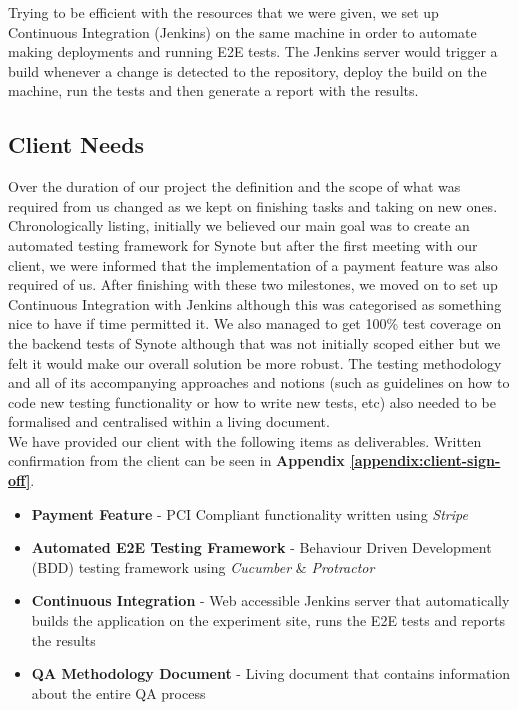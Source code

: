 Trying to be efficient with the resources that we were given, we set up Continuous Integration (Jenkins) on the same machine in order to automate making deployments and running E2E tests. The Jenkins server would trigger a build whenever a change is detected to the repository, deploy the build on the machine, run the tests and then generate a report with the results.

\subsection{Client Needs}
\label{subsec:client-needs}

Over the duration of our project the definition and the scope of what was required from us changed as we kept on finishing tasks and taking on new ones. \\

Chronologically listing, initially we believed our main goal was to create an automated testing framework for Synote but after the first meeting with our client, we were informed that the implementation of a payment feature was also required of us. After finishing with these two milestones, we moved on to set up Continuous Integration with Jenkins although this was categorised as something nice to have if time permitted it. We also managed to get 100\% test coverage on the backend tests of Synote although that was not initially scoped either but we felt it would make our overall solution be more robust. The testing methodology and all of its accompanying approaches and notions (such as guidelines on how to code new testing functionality or how to write new tests, etc) also needed to be formalised and centralised within a living document. \\

We have provided our client with the following items as deliverables. Written confirmation from the client can be seen in \textbf{Appendix \ref{appendix:client-sign-off}}.

\begin{itemize}
    \item \textbf{Payment Feature} - PCI Compliant functionality written using \textit{Stripe}
    \item \textbf{Automated E2E Testing Framework} - Behaviour Driven Development (BDD) testing framework using \textit{Cucumber} \& \textit{Protractor}
    \item \textbf{Continuous Integration} - Web accessible Jenkins server that automatically builds the application on the experiment site, runs the E2E tests and reports the results
    \item \textbf{QA Methodology Document} - Living document that contains information about the entire QA process
\end{itemize}

